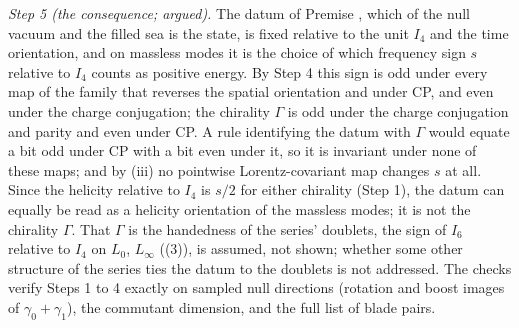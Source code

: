 \emph{Step 5 (the consequence; argued).} The datum of Premise , which of the null vacuum and the filled sea is the state, is fixed relative to the unit $I_{4}$ and the time orientation, and on massless modes it is the choice of which frequency sign $s$ relative to $I_{4}$ counts as positive energy. By Step 4 this sign is odd under every map of the family that reverses the spatial orientation and under CP, and even under the charge conjugation; the chirality $\Gamma$ is odd under the charge conjugation and parity and even under CP. A rule identifying the datum with $\Gamma$ would equate a bit odd under CP with a bit even under it, so it is invariant under none of these maps; and by (iii) no pointwise Lorentz-covariant map changes $s$ at all. Since the helicity relative to $I_{4}$ is $s/2$ for either chirality (Step 1), the datum can equally be read as a helicity orientation of the massless modes; it is not the chirality $\Gamma$. That $\Gamma$ is the handedness of the series' doublets, the sign of $I_{6}$ relative to $I_{4}$ on $L_{0}$, $L_{\infty}$ ((3)), is assumed, not shown; whether some other structure of the series ties the datum to the doublets is not addressed. The checks verify Steps 1 to 4 exactly on sampled null directions (rotation and boost images of $\gamma_{0} + \gamma_{1}$), the commutant dimension, and the full list of blade pairs.
